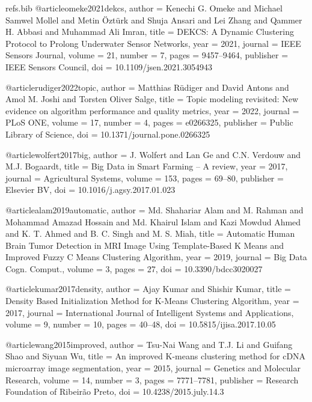 \begin{filecontents*}[overwrite]{refs.bib}
@article{omeke2021dekcs,
  author = {Kenechi G. Omeke and Michael Samwel Mollel and Metin {\"O}zt{\"u}rk and Shuja Ansari and Lei Zhang and Qammer H. Abbasi and Muhammad Ali Imran},
  title = {{DEKCS: A Dynamic Clustering Protocol to Prolong Underwater Sensor Networks}},
  year = {2021},
  journal = {IEEE Sensors Journal},
  volume = {21},
  number = {7},
  pages = {9457--9464},
  publisher = {IEEE Sensors Council},
  doi = {10.1109/jsen.2021.3054943}
}

@article{rudiger2022topic,
  author = {Matthias R{\"u}diger and David Antons and Amol M. Joshi and Torsten Oliver Salge},
  title = {{Topic modeling revisited: New evidence on algorithm performance and quality metrics}},
  year = {2022},
  journal = {PLoS ONE},
  volume = {17},
  number = {4},
  pages = {e0266325},
  publisher = {Public Library of Science},
  doi = {10.1371/journal.pone.0266325}
}

@article{wolfert2017big,
  author = {J. Wolfert and Lan Ge and C.N. Verdouw and M.J. Bogaardt},
  title = {{Big Data in Smart Farming -- A review}},
  year = {2017},
  journal = {Agricultural Systems},
  volume = {153},
  pages = {69--80},
  publisher = {Elsevier BV},
  doi = {10.1016/j.agsy.2017.01.023}
}

@article{alam2019automatic,
  author = {Md. Shahariar Alam and M. Rahman and Mohammad Amazad Hossain and Md. Khairul Islam and Kazi Mowdud Ahmed and K. T. Ahmed and B. C. Singh and M. S. Miah},
  title = {{Automatic Human Brain Tumor Detection in MRI Image Using Template-Based K Means and Improved Fuzzy C Means Clustering Algorithm}},
  year = {2019},
  journal = {Big Data Cogn. Comput.},
  volume = {3},
  pages = {27},
  doi = {10.3390/bdcc3020027}
}

@article{kumar2017density,
  author = {Ajay Kumar and Shishir Kumar},
  title = {{Density Based Initialization Method for K-Means Clustering Algorithm}},
  year = {2017},
  journal = {International Journal of Intelligent Systems and Applications},
  volume = {9},
  number = {10},
  pages = {40--48},
  doi = {10.5815/ijisa.2017.10.05}
}

@article{wang2015improved,
  author = {Tsu{-}Nai Wang and T.J. Li and Guifang Shao and Siyuan Wu},
  title = {{An improved K-means clustering method for cDNA microarray image segmentation}},
  year = {2015},
  journal = {Genetics and Molecular Research},
  volume = {14},
  number = {3},
  pages = {7771--7781},
  publisher = {Research Foundation of Ribeir{\~a}o Preto},
  doi = {10.4238/2015.july.14.3}
}


\end{filecontents*}
